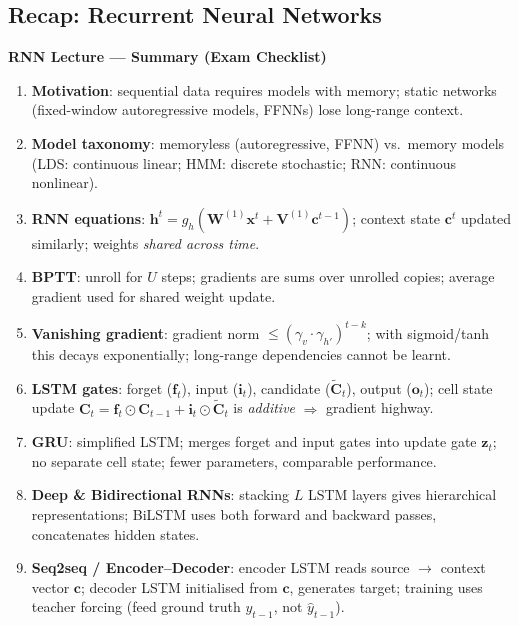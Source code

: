 \documentclass[11pt,a4paper]{article}
\begin{document}
\subsection{Recap: Recurrent Neural Networks}
\label{sec:recap_rnn}

\begin{tcolorbox}[colback=WarningRedBg,colframe=WarningRed,boxrule=0.8pt,arc=3pt]
\textbf{RNN Lecture — Summary (Exam Checklist)}
\begin{enumerate}
  \item \textbf{Motivation}: sequential data requires models with memory; static networks (fixed-window autoregressive models, FFNNs) lose long-range context.
  \item \textbf{Model taxonomy}: memoryless (autoregressive, FFNN) vs.\ memory models (LDS: continuous linear; HMM: discrete stochastic; RNN: continuous nonlinear).
  \item \textbf{RNN equations}: $\mathbf{h}^t = g_h(\mathbf{W}^{(1)}\mathbf{x}^t + \mathbf{V}^{(1)}\mathbf{c}^{t-1})$; context state $\mathbf{c}^t$ updated similarly; weights \emph{shared across time}.
  \item \textbf{BPTT}: unroll for $U$ steps; gradients are sums over unrolled copies; average gradient used for shared weight update.
  \item \textbf{Vanishing gradient}: gradient norm $\leq (\gamma_v \cdot \gamma_{h'})^{t-k}$; with sigmoid/tanh this decays exponentially; long-range dependencies cannot be learnt.
  \item \textbf{LSTM gates}: forget ($\mathbf{f}_t$), input ($\mathbf{i}_t$), candidate ($\tilde{\mathbf{C}}_t$), output ($\mathbf{o}_t$); cell state update $\mathbf{C}_t = \mathbf{f}_t \odot \mathbf{C}_{t-1} + \mathbf{i}_t \odot \tilde{\mathbf{C}}_t$ is \emph{additive} $\Rightarrow$ gradient highway.
  \item \textbf{GRU}: simplified LSTM; merges forget and input gates into update gate $\mathbf{z}_t$; no separate cell state; fewer parameters, comparable performance.
  \item \textbf{Deep \& Bidirectional RNNs}: stacking $L$ LSTM layers gives hierarchical representations; BiLSTM uses both forward and backward passes, concatenates hidden states.
  \item \textbf{Seq2seq / Encoder--Decoder}: encoder LSTM reads source $\to$ context vector $\mathbf{c}$; decoder LSTM initialised from $\mathbf{c}$, generates target; training uses teacher forcing (feed ground truth $y_{t-1}$, not $\hat{y}_{t-1}$).

\end{enumerate}
\end{tcolorbox}
\end{document}
